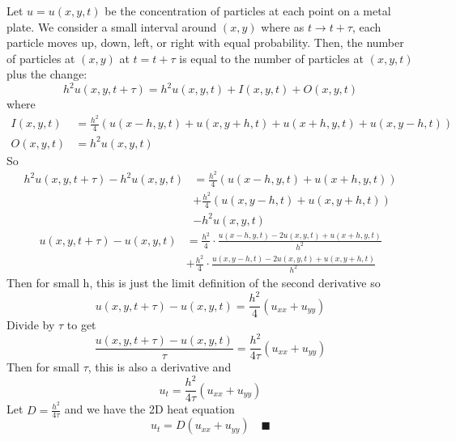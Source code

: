 \documentclass[12pt]{article}
\newcommand{\qed}{\quad \blacksquare}
\begin{document}
\color{blue}
Let $u = u(x, y, t)$ be the concentration of particles at each point on a metal plate. We consider a small interval around $(x, y)$ where as $t \to t + \tau$, each particle moves up, down, left, or right with equal probability. Then, the number of particles at $(x, y)$ at $t = t + \tau$ is equal to the number of particles at $(x, y, t)$ plus the change:
\[h^2u(x, y, t + \tau) = h^2u(x, y, t) + I(x, y, t) + O(x, y, t)\]
where
\begin{align*}
    I(x, y, t) &= \frac{h^2}{4}\left(u(x - h, y, t) + u(x, y + h, t) + u(x + h, y, t) + u(x, y - h, t)\right)\\
    O(x, y, t) &= h^2u(x, y, t)
\end{align*} 
So 
\begin{align*}
    h^2u(x, y, t + \tau) - h^2u(x, y, t) &= \frac{h^2}{4}\left(u(x - h, y, t) + u(x + h, y, t)\right)\\
    &+ \frac{h^2}{4}\left(u(x, y - h, t) + u(x, y + h, t)\right)\\
    & - h^2u(x, y, t)
\end{align*}
\begin{align*}
    u(x, y, t + \tau) - u(x, y, t) &= \frac{h^2}{4}\cdot \frac{u(x- h, y, t) - 2u(x, y, t) + u(x + h, y, t)}{h^2}\\
    &+ \frac{h^2}{4}\cdot\frac{u(x, y - h, t) - 2u(x, y, t) + u(x, y + h, t)}{h^2}
\end{align*}
Then for small h, this is just the limit definition of the second derivative so 
\[u(x, y, t + \tau) - u(x, y, t) = \frac{h^2}{4}(u_{xx} + u_{yy})\]
Divide by $\tau$ to get
\[\frac{u(x, y, t + \tau) - u(x, y, t)}{\tau} = \frac{h^2}{4\tau}(u_{xx} + u_{yy})\]
Then for small $\tau$, this is also a derivative and 
\[u_t = \frac{h^2}{4\tau}(u_{xx} + u_{yy})\]
Let $D = \frac{h^2}{4\tau}$ and we have the 2D heat equation 
\[u_t = D(u_{xx} + u_{yy}) \qed\]
\end{document}
